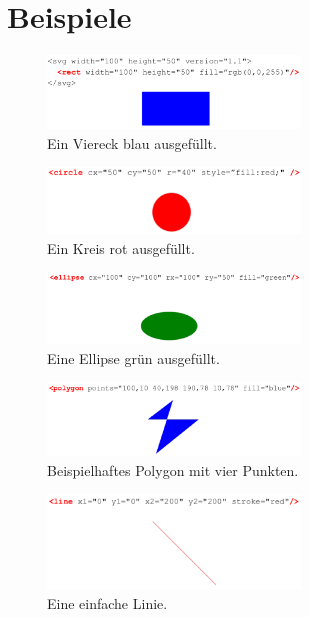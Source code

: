 \appendix

\section{Beispiele}

\begin{figure}[h]\centering
\includegraphics[width=0.6\textwidth]{pictures/rect.png}
\caption{Ein Viereck blau ausgefüllt.}
\label{fig:rect}
\end{figure}
\begin{figure}[h]\centering
\includegraphics[width=0.6\textwidth]{pictures/circle.png}
\caption{Ein Kreis rot ausgefüllt.}
\label{fig:circle}
\end{figure}
\begin{figure}[h]\centering
\includegraphics[width=0.6\textwidth]{pictures/ellipse.png}
\caption{Eine Ellipse grün ausgefüllt.}
\label{fig:ellipse}
\end{figure}
\begin{figure}[h]\centering
\includegraphics[width=0.6\textwidth]{pictures/polygon.png}
\caption{Beispielhaftes Polygon mit vier Punkten.}
\label{fig:poly}
\end{figure}
\begin{figure}[h]\centering
\includegraphics[width=0.6\textwidth]{pictures/line.png}
\caption{Eine einfache Linie.}
\label{fig:line}
\end{figure}
